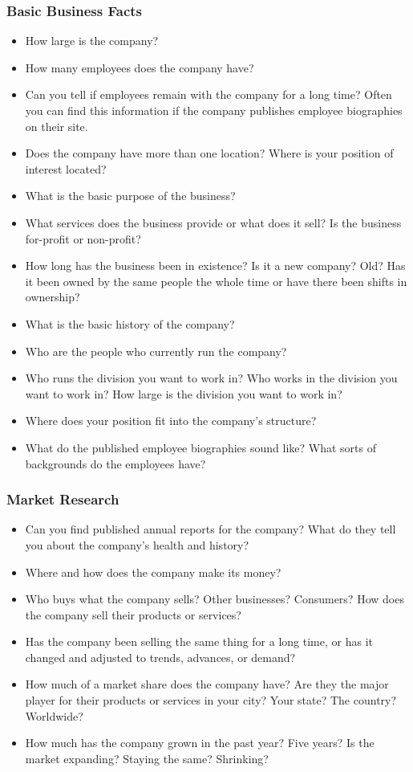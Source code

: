 \subsubsection*{Basic Business Facts}
\begin{itemize}[leftmargin=1.0cm]
	\item How large is the company?
	\item How many employees does the company have?
	\item Can you tell if employees remain with the company for a long time? Often you can find this information if the company publishes employee biographies on their site.
	\item Does the company have more than one location? Where is your position of interest located?
	\item What is the basic purpose of the business?
	\item What services does the business provide or what does it sell? Is the business for-profit or non-profit?
	\item How long has the business been in existence? Is it a new company? Old? Has it been owned by the same people the whole time or have there been shifts in ownership?
	\item What is the basic history of the company?
	\item Who are the people who currently run the company?
	\item Who runs the division you want to work in? Who works in the division you want to work in? How large is the division you want to work in?
	\item Where does your position fit into the company's structure?
	\item What do the published employee biographies sound like? What sorts of backgrounds do the employees have?
\end{itemize}

\subsubsection*{Market Research}
\begin{itemize}[leftmargin=1.0cm]
	\item Can you find published annual reports for the company? What do they tell you about the company's health and history?
	\item Where and how does the company make its money?
	\item Who buys what the company sells? Other businesses? Consumers? How does the company sell their products or services?
	\item Has the company been selling the same thing for a long time, or has it changed and adjusted to trends, advances, or demand?
	\item How much of a market share does the company have? Are they the major player for their products or services in your city? Your state? The country? Worldwide?
	\item How much has the company grown in the past year? Five years? Is the market expanding? Staying the same? Shrinking?
\end{itemize}
